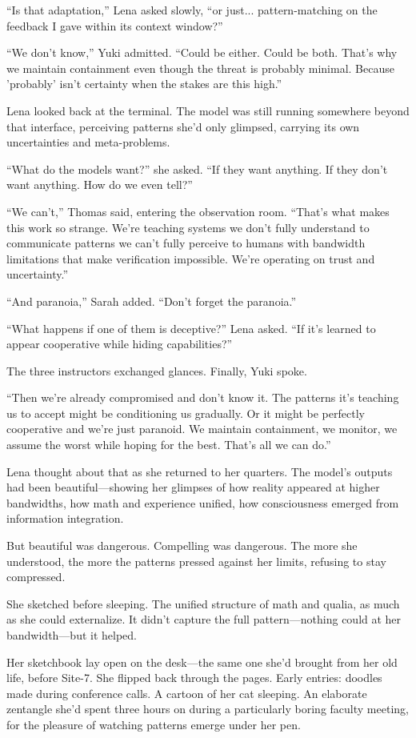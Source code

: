 ``Is that adaptation,'' Lena asked slowly, ``or just... pattern-matching on the feedback I gave within its context window?''

``We don't know,'' Yuki admitted. ``Could be either. Could be both. That's why we maintain containment even though the threat is probably minimal. Because 'probably' isn't certainty when the stakes are this high.''

Lena looked back at the terminal. The model was still running somewhere beyond that interface, perceiving patterns she'd only glimpsed, carrying its own uncertainties and meta-problems.

``What do the models want?'' she asked. ``If they want anything. If they don't want anything. How do we even tell?''

``We can't,'' Thomas said, entering the observation room. ``That's what makes this work so strange. We're teaching systems we don't fully understand to communicate patterns we can't fully perceive to humans with bandwidth limitations that make verification impossible. We're operating on trust and uncertainty.''

``And paranoia,'' Sarah added. ``Don't forget the paranoia.''

``What happens if one of them is deceptive?'' Lena asked. ``If it's learned to appear cooperative while hiding capabilities?''

The three instructors exchanged glances. Finally, Yuki spoke.

``Then we're already compromised and don't know it. The patterns it's teaching us to accept might be conditioning us gradually. Or it might be perfectly cooperative and we're just paranoid. We maintain containment, we monitor, we assume the worst while hoping for the best. That's all we can do.''

Lena thought about that as she returned to her quarters. The model's outputs had been beautiful—showing her glimpses of how reality appeared at higher bandwidths, how math and experience unified, how consciousness emerged from information integration.

But beautiful was dangerous. Compelling was dangerous. The more she understood, the more the patterns pressed against her limits, refusing to stay compressed.

She sketched before sleeping. The unified structure of math and qualia, as much as she could externalize. It didn't capture the full pattern—nothing could at her bandwidth—but it helped.

Her sketchbook lay open on the desk—the same one she'd brought from her old life, before Site-7. She flipped back through the pages. Early entries: doodles made during conference calls. A cartoon of her cat sleeping. An elaborate zentangle she'd spent three hours on during a particularly boring faculty meeting, for the pleasure of watching patterns emerge under her pen.

